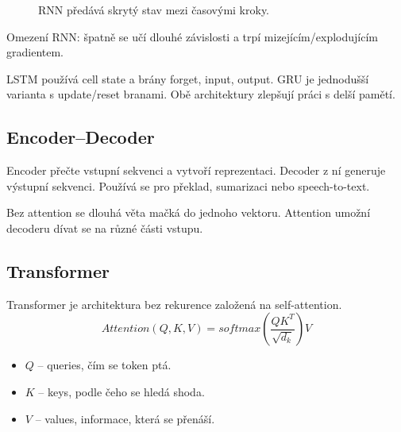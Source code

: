 \begin{figure}[H]
    \centering
    \caption{RNN předává skrytý stav mezi časovými kroky.}
\end{figure}

Omezení RNN: špatně se učí dlouhé závislosti a trpí mizejícím/explodujícím
gradientem.

LSTM používá cell state a brány forget, input, output. GRU je jednodušší
varianta s update/reset branami. Obě architektury zlepšují práci s delší
pamětí.

\subsection*{Encoder--Decoder}
Encoder přečte vstupní sekvenci a vytvoří reprezentaci. Decoder z ní generuje
výstupní sekvenci. Používá se pro překlad, sumarizaci nebo speech-to-text.

Bez attention se dlouhá věta mačká do jednoho vektoru. Attention umožní
decoderu dívat se na různé části vstupu.

\subsection*{Transformer}
Transformer je architektura bez rekurence založená na self-attention.
\begin{equation}
    Attention(Q,K,V)=softmax\left(\frac{QK^T}{\sqrt{d_k}}\right)V
\end{equation}

\begin{itemize}
    \item \(Q\) -- queries, čím se token ptá.
    \item \(K\) -- keys, podle čeho se hledá shoda.
    \item \(V\) -- values, informace, která se přenáší.
\end{itemize}

